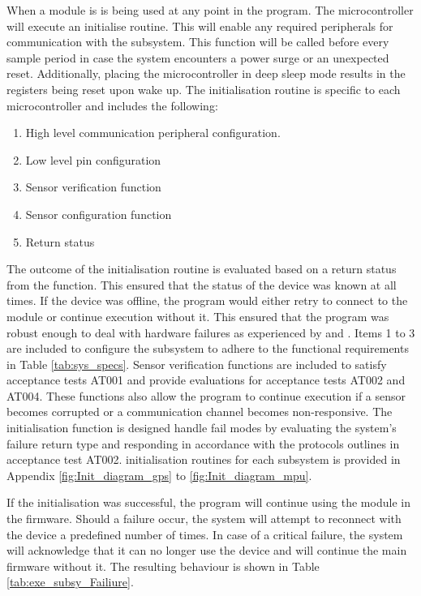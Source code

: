 When a module is is being used at any point in the program. The microcontroller will execute an initialise routine. This will enable any required peripherals for communication with the subsystem. This function will be called before every sample period in case the system encounters a power surge or an unexpected reset. Additionally, placing the microcontroller in deep sleep mode results in the registers being reset upon wake up. The initialisation routine is specific to each microcontroller and includes the following:

\begin{enumerate}
	\item High level communication peripheral configuration.
	\item Low level pin configuration
	\item Sensor verification function
	\item Sensor configuration function
	\item Return status
\end{enumerate}

The outcome of the initialisation routine is evaluated based on a return status from the function. This ensured that the status of the device was known at all times. If the device was offline, the program would either retry to connect to the module or continue execution without it. This ensured that the program was robust enough to deal with hardware failures as experienced by \textcite{doble2017robust} and \textcite{rabault2018investigation}. Items 1 to 3 are included to configure the subsystem to adhere to the functional requirements in Table \ref{tab:sys_specs}. Sensor verification functions are included to satisfy acceptance tests AT001 and provide evaluations for acceptance tests AT002 and AT004. These functions also allow the program to continue execution if a sensor becomes corrupted or a communication channel becomes non-responsive. The initialisation function is designed handle fail modes by evaluating the system's failure return type and responding in accordance with the protocols outlines in acceptance test AT002. initialisation routines for each subsystem is provided in Appendix \ref{fig:Init_diagram_gps} to \ref{fig:Init_diagram_mpu}.

If the initialisation was successful, the program will continue using the module in the firmware. Should a failure occur, the system will attempt to reconnect with the device a predefined number of times. In case of a critical failure, the system will acknowledge that it can no longer use the device and will continue the main firmware without it. The resulting behaviour is shown in Table \ref{tab:exe_subsy_Failiure}.

